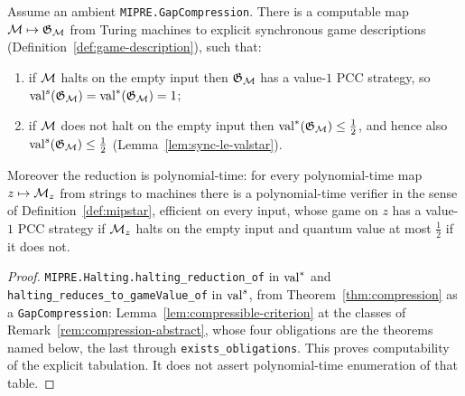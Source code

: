 \begin{theorem}
\label{thm:halting}
\leanok
Assume an ambient \texttt{MIPRE.GapCompression}. There is a computable map
$\mathcal{M} \mapsto \mathfrak{G}_{\mathcal{M}}$ from Turing machines
to explicit synchronous game descriptions (Definition~\ref{def:game-description}),
such that:
\begin{enumerate}
\item if $\mathcal{M}$ halts on the empty input then $\mathfrak{G}_{\mathcal{M}}$ has a value-$1$ PCC
  strategy, so $\mathrm{val}^{s}(\mathfrak{G}_{\mathcal{M}}) = \mathrm{val}^*(\mathfrak{G}_{\mathcal{M}}) = 1$;
\item if $\mathcal{M}$ does not halt on the empty input then
  $\mathrm{val}^*(\mathfrak{G}_{\mathcal{M}}) \leq \tfrac12$, and hence also
  $\mathrm{val}^{s}(\mathfrak{G}_{\mathcal{M}}) \leq \tfrac12$ (Lemma~\ref{lem:sync-le-valstar}).
\end{enumerate}
Moreover the reduction is polynomial-time: for every polynomial-time map $z \mapsto
\mathcal{M}_z$ from strings to machines there is a polynomial-time verifier in the sense of
Definition~\ref{def:mipstar}, efficient on every input, whose game on $z$ has a value-$1$ PCC
strategy if $\mathcal{M}_z$ halts on the empty input and quantum value at most $\tfrac12$ if it
does not.
\end{theorem}

\begin{proof}
\leanok
\texttt{MIPRE.Halting.halting\_reduction\_of} in $\mathrm{val}^*$ and
\texttt{halting\_reduces\_to\_gameValue\_of} in $\mathrm{val}^{s}$, from
Theorem~\ref{thm:compression} as a \texttt{GapCompression}: Lemma~\ref{lem:compressible-criterion}
at the classes of Remark~\ref{rem:compression-abstract}, whose four obligations are the
theorems named below, the last through \texttt{exists\_obligations}. This proves
computability of the explicit tabulation. It does not assert polynomial-time
enumeration of that table.
\end{proof}

